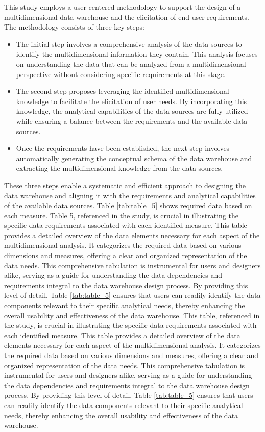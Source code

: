 \documentclass[12pt,twoside]{reedthesis}
\begin{document}
This study employs a user-centered methodology to support the design of a multidimensional data warehouse and the elicitation of end-user requirements. The methodology consists of three key steps:
\begin{itemize}
\item
  The initial step involves a comprehensive analysis of the data sources to identify the multidimensional information they contain. This analysis focuses on understanding the data that can be analyzed from a multidimensional perspective without considering specific requirements at this stage.
\item
  The second step proposes leveraging the identified multidimensional knowledge to facilitate the elicitation of user needs. By incorporating this knowledge, the analytical capabilities of the data sources are fully utilized while ensuring a balance between the requirements and the available data sources.
\item
  Once the requirements have been established, the next step involves automatically generating the conceptual schema of the data warehouse and extracting the multidimensional knowledge from the data sources.
\end{itemize}
These three steps enable a systematic and efficient approach to designing the data warehouse and aligning it with the requirements and analytical capabilities of the available data sources. Table \ref{tab:table_5} shows required data based on each measure. Table 5, referenced in the study, is crucial in illustrating the specific data requirements associated with each identified measure. This table provides a detailed overview of the data elements necessary for each aspect of the multidimensional analysis. It categorizes the required data based on various dimensions and measures, offering a clear and organized representation of the data needs. This comprehensive tabulation is instrumental for users and designers alike, serving as a guide for understanding the data dependencies and requirements integral to the data warehouse design process. By providing this level of detail, Table \ref{tab:table_5} ensures that users can readily identify the data components relevant to their specific analytical needs, thereby enhancing the overall usability and effectiveness of the data warehouse. This table, referenced in the study, is crucial in illustrating the specific data requirements associated with each identified measure. This table provides a detailed overview of the data elements necessary for each aspect of the multidimensional analysis. It categorizes the required data based on various dimensions and measures, offering a clear and organized representation of the data needs. This comprehensive tabulation is instrumental for users and designers alike, serving as a guide for understanding the data dependencies and requirements integral to the data warehouse design process. By providing this level of detail, Table \ref{tab:table_5} ensures that users can readily identify the data components relevant to their specific analytical needs, thereby enhancing the overall usability and effectiveness of the data warehouse.
\end{document}
